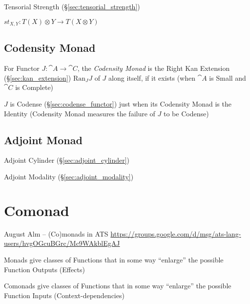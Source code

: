 Tensorial Strength (\S\ref{sec:tensorial_strength})

$st_{X,Y} : T(X) \otimes Y \rightarrow T(X \otimes Y)$



\subsection{Codensity Monad}\label{sec:codensity_monad}

For Functor $J : \cat{A} \rightarrow \cat{C}$, the \emph{Codensity
  Monad} is the Right Kan Extension (\S\ref{sec:kan_extension})
$\mathrm{Ran}_J J$ of $J$ along itself, if it exists (when $\cat{A}$
is Small and $\cat{C}$ is Complete)

$J$ is Codense (\S\ref{sec:codense_functor}) just when its Codensity
Monad is the Identity (Codensity Monad measures the failure of $J$ to
be Codense)



\subsection{Adjoint Monad}\label{sec:adjoint_monad}

Adjoint Cylinder (\S\ref{sec:adjoint_cylinder})

Adjoint Modality (\S\ref{sec:adjoint_modality})



\section{Comonad}\label{sec:comonad}

\asterism


August Alm -- (Co)monads in ATS
\url{https://groups.google.com/d/msg/ats-lang-users/hvgOGcuBGrc/Mc9WAkblEgAJ}

Monads give classes of Functions that in some way ``enlarge'' the
possible Function Outputs (Effects)

Comonads give classes of Functions that in some way ``enlarge'' the
possible Function Inputs (Context-dependencies)

